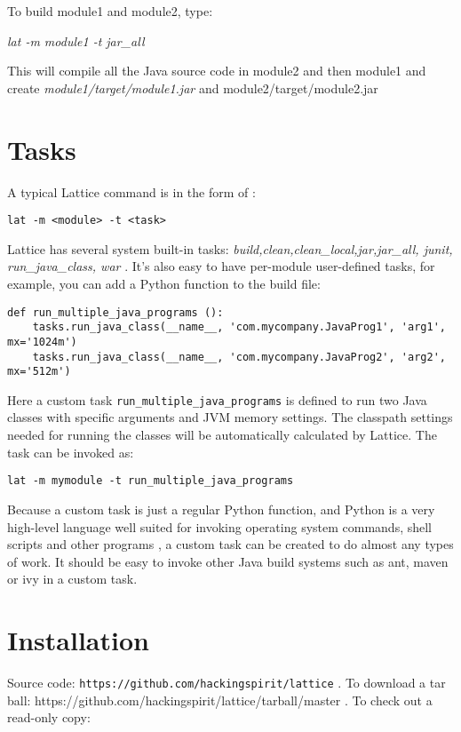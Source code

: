\documentclass[12pt]{article}
\begin{document}
To build module1 and module2, type:

{\it   lat -m module1 -t jar\_all} 

This will compile all the Java source code in module2 and then module1
and create \emph{module1/target/module1.jar} and module2/target/module2.jar


\section{Tasks}

A typical Lattice command is in the form of :

\begin{verbatim}
lat -m <module> -t <task>
\end{verbatim}

Lattice has several system built-in tasks: {\it
  build,clean,clean\_local,jar,jar\_all, junit, run\_java\_class,
  war
}.
It's also easy to have per-module user-defined tasks, for example, you
can add a Python function to the build file:

\begin{verbatim}
def run_multiple_java_programs ():
    tasks.run_java_class(__name__, 'com.mycompany.JavaProg1', 'arg1',
mx='1024m')
    tasks.run_java_class(__name__, 'com.mycompany.JavaProg2', 'arg2',
mx='512m')
\end{verbatim}

Here a custom task {\tt run\_multiple\_java\_programs}  is defined to run two Java classes with specific
arguments and JVM memory settings. The classpath settings needed for
running the classes will be automatically calculated by Lattice. The
task can be invoked as:
\begin{verbatim}
lat -m mymodule -t run_multiple_java_programs
\end{verbatim}
Because a custom task is just a regular Python function, and Python is
a very high-level language well suited for invoking operating system
commands, shell scripts and other programs , a
custom task can be created to do almost any types of work. It should
be easy to invoke other Java build systems such as ant, maven or ivy in
a custom task.

\section{Installation}

Source code:  {\tt https://github.com/hackingspirit/lattice}  .
To download a tar ball:
https://github.com/hackingspirit/lattice/tarball/master  .
To check out a read-only copy: 
\end{document}
